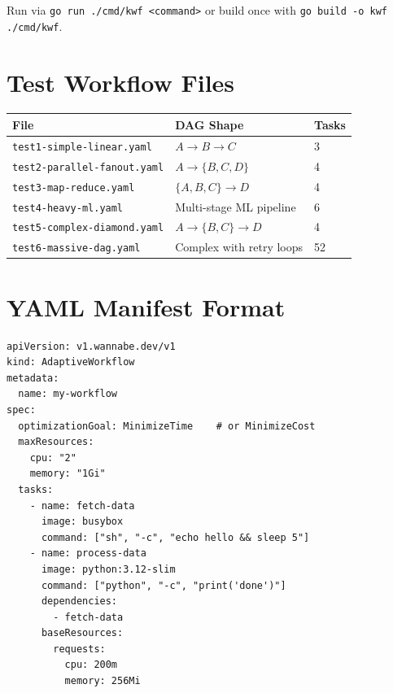 \documentclass[11pt,a4paper]{article}
\begin{document}
Run via \texttt{go run ./cmd/kwf <command>} or build once with \texttt{go build -o kwf ./cmd/kwf}.

\section{Test Workflow Files}

\begin{center}
\begin{tabular}{|l|l|l|}
\hline
\textbf{File} & \textbf{DAG Shape} & \textbf{Tasks} \\
\hline
\texttt{test1-simple-linear.yaml} & $A \to B \to C$ & 3 \\
\texttt{test2-parallel-fanout.yaml} & $A \to \{B, C, D\}$ & 4 \\
\texttt{test3-map-reduce.yaml} & $\{A, B, C\} \to D$ & 4 \\
\texttt{test4-heavy-ml.yaml} & Multi-stage ML pipeline & 6 \\
\texttt{test5-complex-diamond.yaml} & $A \to \{B, C\} \to D$ & 4 \\
\texttt{test6-massive-dag.yaml} & Complex with retry loops & 52 \\
\hline
\end{tabular}
\end{center}

\section{YAML Manifest Format}

\begin{lstlisting}
apiVersion: v1.wannabe.dev/v1
kind: AdaptiveWorkflow
metadata:
  name: my-workflow
spec:
  optimizationGoal: MinimizeTime    # or MinimizeCost
  maxResources:
    cpu: "2"
    memory: "1Gi"
  tasks:
    - name: fetch-data
      image: busybox
      command: ["sh", "-c", "echo hello && sleep 5"]
    - name: process-data
      image: python:3.12-slim
      command: ["python", "-c", "print('done')"]
      dependencies:
        - fetch-data
      baseResources:
        requests:
          cpu: 200m
          memory: 256Mi
\end{lstlisting}
\end{document}
